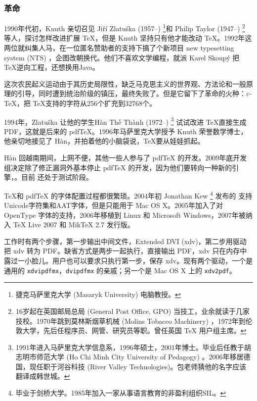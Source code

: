\subsubsection{革命}

1990年代初，Knuth\indexKnuth{} 亲切召见 Jiří Zlatuška (1957--)\indexZlatuska{} \footnote{捷克马萨里克大学 (Masaryk University) 电脑教授。}和 Philip Taylor (1947--)\indexTaylor{} \footnote{16岁起在英国邮局总局 (General Post Office, GPO) 当技工，业余就读于几家技校。1970年跳到莫林斯烟草机械 (Molins Tobacco Machinery) ，1972年到伦敦大学，先后任程序员、网管、研究员等职。曾任英国 TeX 用户组主席。} 等人，探讨怎样改进扩展 \TeX ，但是 Knuth 坚持只有他才能改动 \TeX。1992年这两位就纠集人马，在一位匿名赞助者的支持下搞了个新项目 new typesetting system (NTS) ，企图改朝换代。他们不喜欢文学编程，就派 Karel Skoupý 把 \TeX 逆向工程，还想换用Java。

这次农民起义运动由于其历史局限性，缺乏马克思主义的世界观、方法论和一般原理的引导，同时遭到统治阶级的镇压，最终失败了。但是它留下了革命的火种：$\varepsilon$-\TeX ，把 \TeX 支持的字符从256个扩充到32768个。

1994年，Zlatuška 让他的学生{\lmr Hàn Thế Thành} (1972--)\indexHan{} \footnote{1991年进入马萨里克大学信息系，1996年硕士，2001年博士。毕业后任教于胡志明市师范大学 (Ho Chi Minh City University of Pedagogy) 。2006年移居德国，现任职于河谷科技 (River Valley Technologies)。包老师猜他的名字应该翻译成韩世城。} 试试改进 \TeX 直接生成 PDF，这就是后来的 pdfTeX。1996年马萨里克大学授予 Knuth 荣誉数学博士，他亲切地接见了 Hàn，并拍着他的小脑袋说，\TeX 要从娃娃抓起。

Hàn 回越南期间，上网不便，其他一些人参与了 pdfTeX 的开发。2009年底开发组决定除了修正漏洞外基本停止 pdfTeX 的开发，因为他们要转向一种新的引擎，\LuaTeX。目前 \LuaTeX 还处于测试阶段。

\TeX 和 pdfTeX 的字体配置过程都很繁琐。2004年初 Jonathan Kew\indexKew{} \footnote{毕业于剑桥大学。1985年加入一家从事语言教育的非盈利组织SIL\indexSIL。} 发布的 \XeTeX 支持Unicode字符集和AAT字体，但是只能用于 Mac OS X。2005年加入了对 OpenType 字体的支持，2006年移植到 Linux 和 Microsoft Windows，2007年被纳入 TeX Live 2007 和 MikTeX 2.7 发行版。

\XeTeX 工作时有两个步骤，第一步输出中间文件，Extended DVI (xdv)，第二步用驱动把 xdv 转为 PDF。缺省方式是两步一起执行，直接输出 PDF，xdv 只在内存中露过一小脸儿。用户也可以要求只执行第一步，保存 xdv。\XeTeX 现有两个驱动，一个是通用的 \texttt{xdvipdfmx}，\texttt{dvipdfmx} 的亲戚；另一个是 Mac OS X 上的 \texttt{xdv2pdf}。

